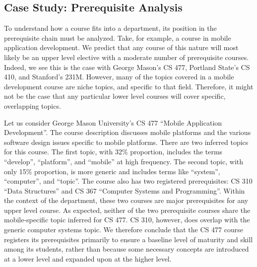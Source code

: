 
\subsection{Case Study: Prerequisite Analysis}
\label{sec:eval-prerequisites}


To understand how a course fits into a department, its position in the prerequisite chain must be analyzed.
Take, for example, a course in mobile application development.
We predict that any course of this nature will most likely be an upper level elective with a moderate number of prerequisite courses.
Indeed, we see this is the case with George Mason's CS 477, Portland State's CS 410, and Stanford's 231M.
However, many of the topics covered in a mobile development course are niche topics, and specific to that field.
Therefore, it might not be the case that any particular lower level courses will cover specific, overlapping topics.


Let us consider George Mason University's CS 477 ``Mobile Application Development''.
The course description discusses mobile platforms and the various software design issues specific to mobile platforms.
There are two inferred topics for this course.
The first topic, with 32\% proportion, includes the terms ``develop'', ``platform'', and ``mobile'' at high frequency.
The second topic, with only 15\% proportion, is more generic and includes terms like ``system'', ``computer'', and ``topic''.
The course also has two registered prerequisites: CS 310 ``Data Structures'' and CS 367 ``Computer Systems and Programming''.
Within the context of the department, these two courses are major prerequisites for any upper level course.
As expected, neither of the two prerequisite courses share the mobile-specific topic inferred for CS 477.
CS 310, however, does overlap with the generic computer systems topic.
We therefore conclude that the CS 477 course registers its prerequisites primarily to ensure a baseline level of maturity and skill among its students, rather than because some necessary concepts are introduced at a lower level and expanded upon at the higher level.


